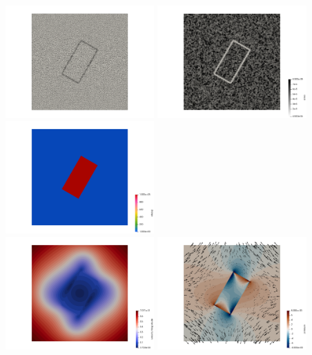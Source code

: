 \begin{center}
\includegraphics[width=5.7cm]{python_codes/fieldstone_142/results/case1/mesh}
\includegraphics[width=5.7cm]{python_codes/fieldstone_142/results/case1/areas}
\includegraphics[width=5.7cm]{python_codes/fieldstone_142/results/case1/eta}\\
\includegraphics[width=5.7cm]{python_codes/fieldstone_142/results/case1/vel1}
\includegraphics[width=5.7cm]{python_codes/fieldstone_142/results/case1/press1}

\end{center}
